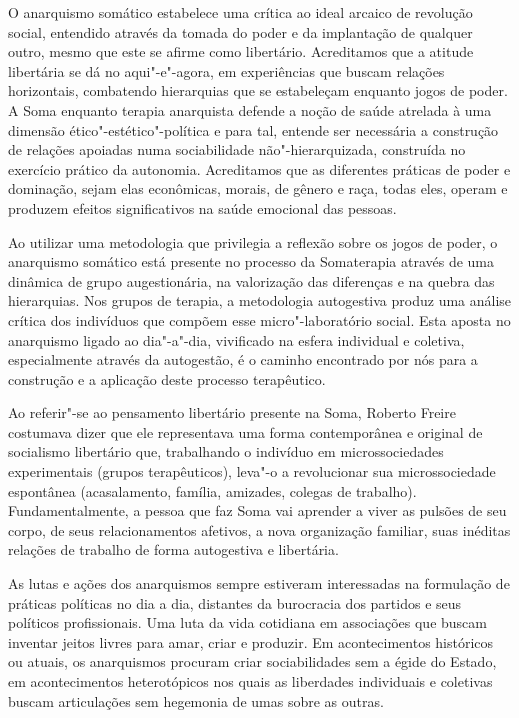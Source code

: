 O anarquismo somático estabelece uma crítica ao ideal arcaico de
revolução social, entendido através da tomada do poder e da implantação
de qualquer outro, mesmo que este se afirme como libertário. Acreditamos
que a atitude libertária se dá no aqui"-e"-agora, em experiências que
buscam relações horizontais, combatendo hierarquias que se estabeleçam
enquanto jogos de poder. A Soma enquanto terapia anarquista defende a
noção de saúde atrelada à uma dimensão ético"-estético"-política e para
tal, entende ser necessária a construção de relações apoiadas numa
sociabilidade não"-hierarquizada, construída no exercício prático da
autonomia. Acreditamos que as diferentes práticas de poder e dominação,
sejam elas econômicas, morais, de gênero e raça, todas eles, operam e
produzem efeitos significativos na saúde emocional das pessoas.

Ao utilizar uma metodologia que privilegia a reflexão sobre os jogos de
poder, o anarquismo somático está presente no processo da Somaterapia
através de uma dinâmica de grupo augestionária, na valorização das
diferenças e na quebra das hierarquias. Nos grupos de terapia, a
metodologia autogestiva produz uma análise crítica dos indivíduos que
compõem esse micro"-laboratório social. Esta aposta no anarquismo ligado
ao dia"-a"-dia, vivificado na esfera individual e coletiva, especialmente
através da autogestão, é o caminho encontrado por nós para a construção
e a aplicação deste processo terapêutico.

Ao referir"-se ao pensamento libertário presente na Soma, Roberto Freire
costumava dizer que ele representava uma forma contemporânea e original
de socialismo libertário que, traba­lhando o indivíduo em
microssociedades experimentais (grupos terapêu­ticos), leva"-o a
revolucionar sua microssociedade espontânea (acasala­mento, família,
amizades, colegas de trabalho). Fundamentalmente, a pessoa que faz So­ma
vai aprender a viver as pulsões de seu corpo, de seus relacionamentos
afetivos, a nova organização familiar, suas inéditas relações de
trabalho de forma autogestiva e libertária.

As lutas e ações dos anarquismos sempre estiveram interessadas na
formulação de práticas políticas no dia a dia, distantes da burocracia
dos partidos e seus políticos profissionais. Uma luta da vida cotidiana
em associações que buscam inventar jeitos livres para amar, criar e
produzir. Em acontecimentos históricos ou atuais, os anarquismos
procuram criar sociabilidades sem a égide do Estado, em acontecimentos
heterotópicos nos quais as liberdades individuais e coletivas buscam
articulações sem hegemonia de umas sobre as outras.


